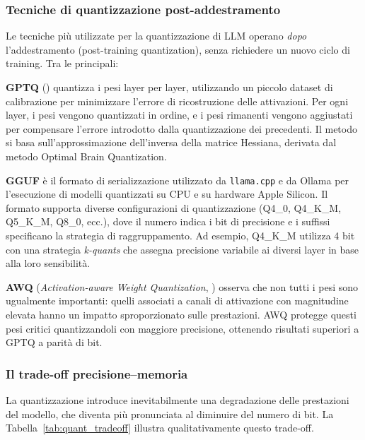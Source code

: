 \subsubsection{Tecniche di quantizzazione post-addestramento}

Le tecniche più utilizzate per la quantizzazione di LLM operano \textit{dopo} l'addestramento (post-training quantization), senza richiedere un nuovo ciclo di training. Tra le principali:

\textbf{GPTQ} (\cite{frantar2023gptqaccurateposttrainingquantization}) quantizza i pesi layer per layer, utilizzando un piccolo dataset di calibrazione per minimizzare l'errore di ricostruzione delle attivazioni. Per ogni layer, i pesi vengono quantizzati in ordine, e i pesi rimanenti vengono aggiustati per compensare l'errore introdotto dalla quantizzazione dei precedenti. Il metodo si basa sull'approssimazione dell'inversa della matrice Hessiana, derivata dal metodo Optimal Brain Quantization.

\textbf{GGUF} è il formato di serializzazione utilizzato da \texttt{llama.cpp} e da Ollama per l'esecuzione di modelli quantizzati su CPU e su hardware Apple Silicon. Il formato supporta diverse configurazioni di quantizzazione (Q4\_0, Q4\_K\_M, Q5\_K\_M, Q8\_0, ecc.), dove il numero indica i bit di precisione e i suffissi specificano la strategia di raggruppamento. Ad esempio, Q4\_K\_M utilizza 4 bit con una strategia \textit{k-quants} che assegna precisione variabile ai diversi layer in base alla loro sensibilità.

\textbf{AWQ} (\textit{Activation-aware Weight Quantization}, \cite{lin2024awqactivationawareweightquantization}) osserva che non tutti i pesi sono ugualmente importanti: quelli associati a canali di attivazione con magnitudine elevata hanno un impatto sproporzionato sulle prestazioni. AWQ protegge questi pesi critici quantizzandoli con maggiore precisione, ottenendo risultati superiori a GPTQ a parità di bit.

\subsubsection{Il trade-off precisione--memoria}

La quantizzazione introduce inevitabilmente una degradazione delle prestazioni del modello, che diventa più pronunciata al diminuire del numero di bit. La Tabella~\ref{tab:quant_tradeoff} illustra qualitativamente questo trade-off.

